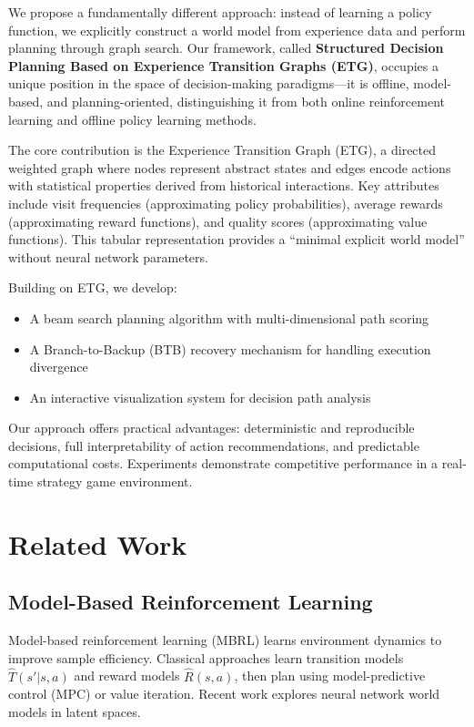 \documentclass[letterpaper]{article}
\begin{document}
We propose a fundamentally different approach: instead of learning a policy function, we explicitly construct a world model from experience data and perform planning through graph search. Our framework, called \textbf{Structured Decision Planning Based on Experience Transition Graphs (ETG)}, occupies a unique position in the space of decision-making paradigms—it is offline, model-based, and planning-oriented, distinguishing it from both online reinforcement learning and offline policy learning methods.

The core contribution is the Experience Transition Graph (ETG), a directed weighted graph where nodes represent abstract states and edges encode actions with statistical properties derived from historical interactions. Key attributes include visit frequencies (approximating policy probabilities), average rewards (approximating reward functions), and quality scores (approximating value functions). This tabular representation provides a ``minimal explicit world model'' without neural network parameters.

Building on ETG, we develop:
\begin{itemize}
    \item A beam search planning algorithm with multi-dimensional path scoring
    \item A Branch-to-Backup (BTB) recovery mechanism for handling execution divergence
    \item An interactive visualization system for decision path analysis
\end{itemize}

Our approach offers practical advantages: deterministic and reproducible decisions, full interpretability of action recommendations, and predictable computational costs. Experiments demonstrate competitive performance in a real-time strategy game environment.

\section{Related Work}

\subsection{Model-Based Reinforcement Learning}

Model-based reinforcement learning (MBRL) learns environment dynamics to improve sample efficiency. Classical approaches learn transition models $\hat{T}(s'|s,a)$ and reward models $\hat{R}(s,a)$, then plan using model-predictive control (MPC) or value iteration. Recent work explores neural network world models in latent spaces.
\end{document}
